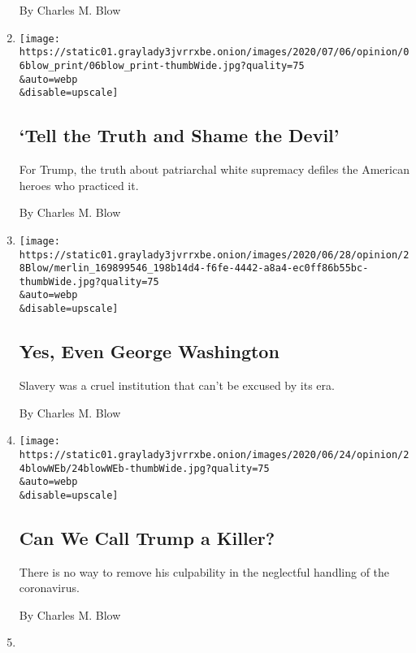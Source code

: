 \begin{enumerate}
  By Charles M. Blow
\item
  \href{/2020/07/05/opinion/trump-monuments.html}{}

  \texttt{[image: https://static01.graylady3jvrrxbe.onion/images/2020/07/06/opinion/06blow\_print/06blow\_print-thumbWide.jpg?quality=75\\\&auto=webp\\\&disable=upscale]}

  \hypertarget{tell-the-truth-and-shame-the-devil}{%
  \subsection{`Tell the Truth and Shame the
  Devil'}\label{tell-the-truth-and-shame-the-devil}}

  For Trump, the truth about patriarchal white supremacy defiles the
  American heroes who practiced it.

  By Charles M. Blow
\item
  \href{/2020/06/28/opinion/george-washington-confederate-statues.html}{}

  \texttt{[image: https://static01.graylady3jvrrxbe.onion/images/2020/06/28/opinion/28Blow/merlin\_169899546\_198b14d4-f6fe-4442-a8a4-ec0ff86b55bc-thumbWide.jpg?quality=75\\\&auto=webp\\\&disable=upscale]}

  \hypertarget{yes-even-george-washington}{%
  \subsection{Yes, Even George
  Washington}\label{yes-even-george-washington}}

  Slavery was a cruel institution that can't be excused by its era.

  By Charles M. Blow
\item
  \href{/2020/06/24/opinion/trump-coronavirus-deaths.html}{}

  \texttt{[image: https://static01.graylady3jvrrxbe.onion/images/2020/06/24/opinion/24blowWEb/24blowWEb-thumbWide.jpg?quality=75\\\&auto=webp\\\&disable=upscale]}

  \hypertarget{can-we-call-trump-a-killer}{%
  \subsection{Can We Call Trump a
  Killer?}\label{can-we-call-trump-a-killer}}

  There is no way to remove his culpability in the neglectful handling
  of the coronavirus.

  By Charles M. Blow
\item
  \href{/2020/06/21/opinion/trump-police-reform.html}{}


\end{enumerate}
